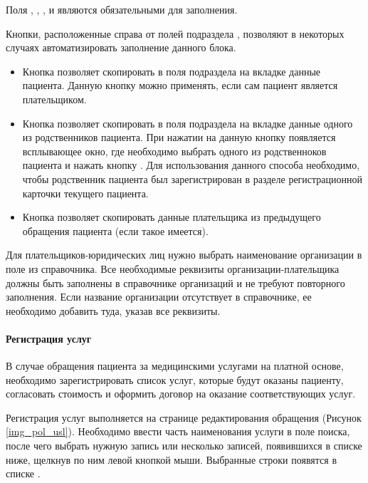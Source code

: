 {Поля , , ,  и  являются обязательными для заполнения.

Кнопки, расположенные справа от полей подраздела , позволяют в некоторых случаях автоматизировать заполнение данного блока. 
\begin{itemize}
	\item Кнопка  позволяет скопировать в поля подраздела  на вкладке  данные пациента. Данную кнопку можно применять, если сам пациент является плательщиком.
	\item Кнопка  позволяет скопировать в поля подраздела  на вкладке  данные одного из родственников пациента. При нажатии на данную кнопку появляется всплывающее окно, где необходимо выбрать одного из родственноков пациента и нажать кнопку . Для использования данного способа необходимо, чтобы родственник пациента был зарегистрирован в разделе  регистрационной карточки текущего пациента.
	\item Кнопка  позволяет скопировать данные плательщика из предыдущего обращения пациента (если такое имеется).
\end{itemize} 

Для плательщиков-юридических лиц нужно выбрать наименование организации в поле  из справочника.  Все необходимые реквизиты организации-плательщика должны быть заполнены в справочнике организаций и не требуют повторного заполнения. Если название организации отсутствует в справочнике, ее необходимо добавить туда, указав все реквизиты.

\paragraph{Регистрация услуг} \label{ev_regusl}

В случае обращения пациента за медицинскими услугами на платной основе, необходимо зарегистрировать список услуг, которые будут оказаны пациенту, согласовать стоимость и оформить договор на оказание соответствующих услуг.

Регистрация услуг выполняется на странице редактирования обращения (Рисунок \ref{img_pol_usl}). Необходимо ввести часть наименования услуги в поле поиска, после чего выбрать нужную запись или несколько записей, появившихся в списке ниже, щелкнув по ним левой кнопкой мыши. Выбранные строки появятся в списке .

}
